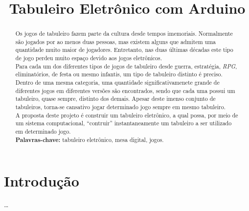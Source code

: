 \documentclass[a4paper,10pt]{article}
\title{Tabuleiro Eletrônico com Arduino}
\author{}
\date{}
\begin{document}
\maketitle

\begin{abstract}
Os jogos de tabuleiro fazem parte da cultura desde tempos imemoriais. Normalmente são jogados por ao menos duas pessoas, mas existem alguns que admitem uma quantidade muito maior de jogadores. Entretanto, nas duas últimas décadas este tipo de jogo perdeu muito espaço devido aos jogos eletrônicos. \\ 

Para cada um dos diferentes tipos de jogos de tabuleiro desde guerra, estratégia, {\it RPG}, eliminatórios, de festa ou mesmo infantis, um tipo de tabuleiro distinto é preciso. Dentro de uma mesma categoria, uma quantidade significativamenete grande de diferentes jogos em diferentes versões são encontrados, sendo que cada uma possui um tabuleiro, quase sempre, distinto dos demais. Apesar deste imenso conjunto de tabuleiros, torna-se cansativo jogar determinado jogo sempre em mesmo tabuleiro. \\

A proposta deste projeto é construir um tabuleiro eletrônico, a qual possa, por meio de um sistema computacional, ``contruir'' instantaneamente um tabuleiro a ser utilizado em determinado jogo. \\

\noindent \textbf{Palavras-chave:} tabuleiro eletrônico, mesa digital, jogos.
\end{abstract}



\section{Introdução}

\ldots
\end{document}
